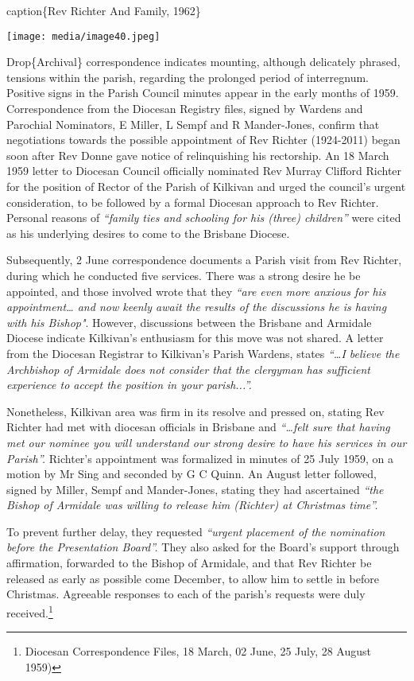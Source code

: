 caption\{Rev Richter And Family, 1962\}

\texttt{[image: media/image40.jpeg]}

Drop\{Archival\} correspondence indicates mounting, although delicately phrased, tensions within the parish, regarding the prolonged period of interregnum. Positive signs in the Parish Council minutes appear in the early months of 1959. Correspondence from the Diocesan Registry files, signed by Wardens and Parochial Nominators, E Miller, L Sempf and R Mander-Jones, confirm that negotiations towards the possible appointment of Rev Richter (1924-2011) began soon after Rev Donne gave notice of relinquishing his rectorship. An 18 March 1959 letter to Diocesan Council officially nominated Rev Murray Clifford Richter for the position of Rector of the Parish of Kilkivan and urged the council's urgent consideration, to be followed by a formal Diocesan approach to Rev Richter. Personal reasons of \emph{``family ties and schooling for his (three) children''} were cited as his underlying desires to come to the Brisbane Diocese.

Subsequently, 2 June correspondence documents a Parish visit from Rev Richter, during which he conducted five services. There was a strong desire he be appointed, and those involved wrote that they \emph{``are even more anxious for his appointment\ldots{} and now keenly await the results of the discussions he is having with his Bishop"}. However, discussions between the Brisbane and Armidale Diocese indicate Kilkivan's enthusiasm for this move was not shared. A letter from the Diocesan Registrar to Kilkivan's Parish Wardens, states \emph{``\ldots I believe the Archbishop of Armidale does not consider that the clergyman has sufficient experience to accept the position in your parish...''.}

Nonetheless, Kilkivan area was firm in its resolve and pressed on, stating Rev Richter had met with diocesan officials in Brisbane and \emph{``\ldots felt sure that having met our nominee you will understand our strong desire to have his services in our Parish''.} Richter's appointment was formalized in minutes of 25 July 1959, on a motion by Mr Sing and seconded by G C Quinn. An August letter followed, signed by Miller, Sempf and Mander-Jones, stating they had ascertained \emph{``the Bishop of Armidale was willing to release him (Richter) at Christmas time''.}

To prevent further delay, they requested \emph{``urgent placement of the nomination before the Presentation Board''.} They also asked for the Board's support through affirmation, forwarded to the Bishop of Armidale, and that Rev Richter be released as early as possible come December, to allow him to settle in before Christmas. Agreeable responses to each of the parish's requests were duly received.\footnote{Diocesan Correspondence Files, 18 March, 02 June, 25 July, 28 August 1959)}

